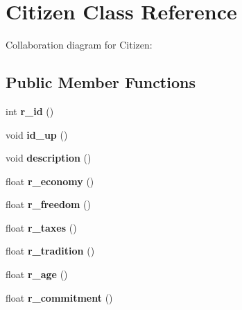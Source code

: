 \hypertarget{classCitizen}{\section{Citizen Class Reference}
\label{classCitizen}
}


Collaboration diagram for Citizen\+:
\subsection*{Public Member Functions}
\begin{DoxyCompactItemize}
\item 
\hypertarget{classCitizen_a677ca68462c202b11974f519017dec5a}{int {\bfseries r\+\_\+id} ()}\label{classCitizen_a677ca68462c202b11974f519017dec5a}

\item 
\hypertarget{classCitizen_a2b52f590d05135fc1ba67b7493e49fa6}{void {\bfseries id\+\_\+up} ()}\label{classCitizen_a2b52f590d05135fc1ba67b7493e49fa6}

\item 
\hypertarget{classCitizen_a020a6d03b0e9ca89da0dfeada0ca2fc9}{void {\bfseries description} ()}\label{classCitizen_a020a6d03b0e9ca89da0dfeada0ca2fc9}

\item 
\hypertarget{classCitizen_a2dc2fe6764276445057e170a4cb3bee6}{float {\bfseries r\+\_\+economy} ()}\label{classCitizen_a2dc2fe6764276445057e170a4cb3bee6}

\item 
\hypertarget{classCitizen_ab0afeae6e2ba7c9f91be452547c344df}{float {\bfseries r\+\_\+freedom} ()}\label{classCitizen_ab0afeae6e2ba7c9f91be452547c344df}

\item 
\hypertarget{classCitizen_af274325e647c727dc317d16c45182242}{float {\bfseries r\+\_\+taxes} ()}\label{classCitizen_af274325e647c727dc317d16c45182242}

\item 
\hypertarget{classCitizen_a7cd55ebc796a7a02a37ab531ca5dc810}{float {\bfseries r\+\_\+tradition} ()}\label{classCitizen_a7cd55ebc796a7a02a37ab531ca5dc810}

\item 
\hypertarget{classCitizen_a28595d40a25a0067e03e9e60234f9d0c}{float {\bfseries r\+\_\+age} ()}\label{classCitizen_a28595d40a25a0067e03e9e60234f9d0c}

\item 
\hypertarget{classCitizen_ae7d66a8413827f2f8a99f5249042a6a4}{float {\bfseries r\+\_\+commitment} ()}\label{classCitizen_ae7d66a8413827f2f8a99f5249042a6a4}


\end{DoxyCompactItemize}
